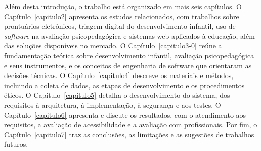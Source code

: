 Além desta introdução, o trabalho está organizado em mais seis capítulos. O Capítulo~\ref{capitulo2} apresenta os estudos relacionados, com trabalhos sobre prontuários eletrônicos, triagem digital do desenvolvimento infantil, uso de \textit{software} na avaliação psicopedagógica e sistemas web aplicados à educação, além das soluções disponíveis no mercado. O Capítulo~\ref{capitulo3-0} reúne a fundamentação teórica sobre desenvolvimento infantil, avaliação psicopedagógica e seus instrumentos, e os conceitos de engenharia de software que orientaram as decisões técnicas. O Capítulo~\ref{capitulo4} descreve os materiais e métodos, incluindo a coleta de dados, as etapas de desenvolvimento e os procedimentos éticos. O Capítulo~\ref{capitulo5} detalha o desenvolvimento do sistema, dos requisitos à arquitetura, à implementação, à segurança e aos testes. O Capítulo~\ref{capitulo6} apresenta e discute os resultados, com o atendimento aos requisitos, a avaliação de acessibilidade e a avaliação com profissionais. Por fim, o Capítulo~\ref{capitulo7} traz as conclusões, as limitações e as sugestões de trabalhos futuros.